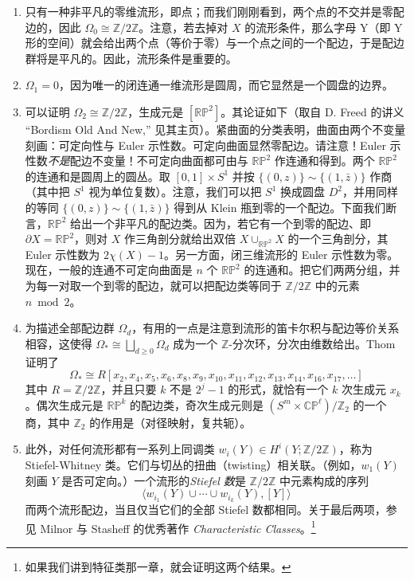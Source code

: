 \begin{enumerate}
  \item 只有一种非平凡的零维流形，即点；而我们刚刚看到，两个点的不交并是零配边的，因此 $\Omega_0\cong\mathbb{Z}/2\mathbb{Z}$。注意，若去掉对 $X$ 的流形条件，那么字母 Y（即 Y 形的空间）就会给出两个点（等价于零）与一个点之间的一个配边，于是配边群将是平凡的。因此，流形条件是重要的。
  \item $\Omega_1=0$，因为唯一的闭连通一维流形是圆周，而它显然是一个圆盘的边界。
  \item 可以证明 $\Omega_2\cong\mathbb{Z}/2\mathbb{Z}$，生成元是 $[\mathbb{RP}^2]$。其论证如下（取自 D. Freed 的讲义 ``Bordism Old And New,'' 见其主页）。紧曲面的分类表明，曲面由两个不变量刻画：可定向性与 Euler 示性数。可定向曲面显然零配边。请注意！Euler 示性数\emph{不是}配边不变量！不可定向曲面都可由与 $\mathbb{RP}^2$ 作连通和得到。两个 $\mathbb{RP}^2$ 的连通和是圆周上的圆丛。取 $[0,1]\times S^1$ 并按 $\{(0,z)\}\sim\{(1,\bar z)\}$ 作商（其中把 $S^1$ 视为单位复数）。注意，我们可以把 $S^1$ 换成圆盘 $D^2$，并用同样的等同 $\{(0,z)\}\sim\{(1,\bar z)\}$ 得到从 Klein 瓶到零的一个配边。下面我们断言，$\mathbb{RP}^2$ 给出一个非平凡的配边类。因为，若它有一个到零的配边、即 $\partial X=\mathbb{RP}^2$，则对 $X$ 作三角剖分就给出双倍 $X\cup_{\mathbb{RP}^2}X$ 的一个三角剖分，其 Euler 示性数为 $2\chi(X)-1$。另一方面，闭三维流形的 Euler 示性数为零。现在，一般的连通不可定向曲面是 $n$ 个 $\mathbb{RP}^2$ 的连通和。把它们两两分组，并为每一对取一个到零的配边，就可以把配边类等同于 $\mathbb{Z}/2\mathbb{Z}$ 中的元素 $n\bmod 2$。
  \item 为描述全部配边群 $\Omega_d$，有用的一点是注意到流形的笛卡尔积与配边等价关系相容，这使得 $\Omega_*\cong\bigsqcup_{d\ge 0}\Omega_d$ 成为一个 $\mathbb{Z}$-分次环，分次由维数给出。Thom 证明了
  \begin{equation}
    \Omega_*\cong R[x_2,x_4,x_5,x_6,x_8,x_9,x_{10},x_{11},x_{12},x_{13},x_{14},x_{16},x_{17},\dots]
    \tag{L.2}
    \label{eq:L.2}
  \end{equation}
  其中 $R=\mathbb{Z}/2\mathbb{Z}$，并且只要 $k$ 不是 $2^j-1$ 的形式，就恰有一个 $k$ 次生成元 $x_k$。偶次生成元是 $\mathbb{RP}^k$ 的配边类，奇次生成元则是 $(S^m\times\mathbb{CP}^\ell)/\mathbb{Z}_2$ 的一个商，其中 $\mathbb{Z}_2$ 的作用是（对径映射，复共轭）。
  \item 此外，对任何流形都有一系列上同调类 $w_i(Y)\in H^i(Y;\mathbb{Z}/2\mathbb{Z})$，称为 Stiefel-Whitney 类。它们与切丛的扭曲（twisting）相关联。（例如，$w_1(Y)$ 刻画 $Y$ 是否可定向。）一个流形的\emph{Stiefel 数}是 $\mathbb{Z}/2\mathbb{Z}$ 中元素构成的序列
  \begin{equation}
    \langle w_{i_1}(Y)\cup\cdots\cup w_{i_k}(Y),[Y]\rangle
    \tag{L.3}
    \label{eq:L.3}
  \end{equation}
  而两个流形配边，当且仅当它们的全部 Stiefel 数都相同。关于最后两项，参见 Milnor 与 Stasheff 的优秀著作 \emph{Characteristic Classes}。\footnote{如果我们讲到特征类那一章，就会证明这两个结果。}
\end{enumerate}

